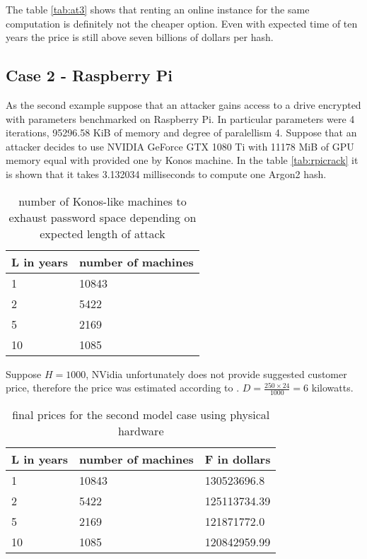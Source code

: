 \documentclass[nolof]{fithesis3}
\begin{document}
The table \ref{tab:at3} shows that renting an online instance for the same computation is definitely not the cheaper option. Even with expected time of ten years the price is still above seven billions of dollars per hash.

\subsection{Case 2 - Raspberry Pi}
As the second example suppose that an attacker gains access to a drive encrypted with parameters benchmarked on Raspberry Pi. In particular parameters were 4 iterations, 95296.58 KiB of memory and degree of paralellism 4. Suppose that an attacker decides to use NVIDIA GeForce GTX 1080 Ti with 11178 MiB of GPU memory equal with provided one by Konos machine. In the table \ref{tab:rpicrack} it is shown that it takes 3.132034 milliseconds to compute one Argon2 hash.

\noindent
\begin{table}
\caption{number of Konos-like machines to exhaust password space depending on expected length of attack}
\label{tab:at4}
\begin{tabularx}{\textwidth}{| X | X |}
\hline
L in years & number of machines\\
\hline
1 & 10843\\	
\hline
2 & 5422\\
\hline
5 & 2169\\
\hline
10 & 1085\\
\hline
\end{tabularx}
\end{table}

Suppose $H = 1000$, NVidia unfortunately does not provide suggested customer price, therefore the price was estimated according to \parencite{geforceprice}. $D = \frac{250 \times 24}{1000} = 6$ kilowatts. 

\noindent
\begin{table}
\caption{final prices for the second model case using physical hardware}
\label{tab:at5}
\begin{tabularx}{\textwidth}{| X | X | X |}
\hline
L  in years & number of machines & F in dollars\\
\hline
1 & 10843 & 130523696.8\\
\hline
2 & 5422 & 125113734.39\\
\hline
5 & 2169 & 121871772.0\\
\hline
10 & 1085 & 120842959.99\\
\hline
\end{tabularx}
\end{table}
\end{document}
